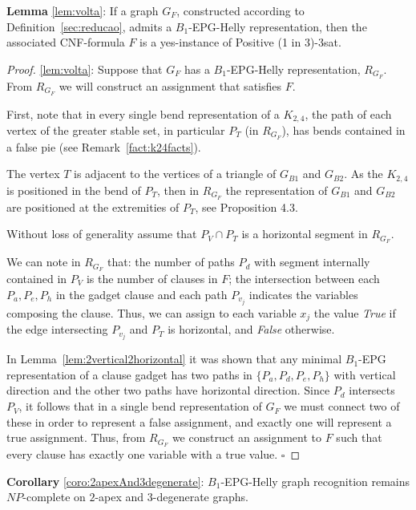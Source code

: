 \documentclass[runningheads]{llncs}
\begin{document}
\begin{lemma*}\textbf{Lemma} \ref{lem:volta}:
If a graph $G_F$, constructed according to Definition~\ref{sec:reducao}, admits a $B_1$-EPG-Helly representation, then the associated CNF-formula $F$ is a yes-instance of {\sc Positive (1 in 3)-3sat}.
\end{lemma*}

\begin{proof}%
\ref{lem:volta}:
Suppose that $G_F$ has a $B_1$-EPG-Helly representation, $R_{G_F}$.  From $R_{G_F}$ we will construct an assignment that satisfies $F$. 

First, note that in every single bend representation of a $K_{2,4}$, the path of each vertex of the greater stable set, in particular $P_T$ (in $R_{G_F}$), has bends contained in a false pie (see Remark~\ref{fact:k24facts}). 


The vertex $T$ is adjacent to the vertices of a triangle of $G_{B1}$ and $G_{B2}$. As the $K_{2,4}$ is positioned in the bend of $P_T$, then in $R_{G_F}$ the representation of $G_{B1}$ and $G_{B2}$ are positioned at the extremities of $P_T$, see Proposition 4.3. %


Without loss of generality assume that $P_V \cap P_T$ is a horizontal segment in $R_{G_F}$.

We can note in $R_{G_F}$ that: the number of paths $P_{d}$ with segment internally contained in $P_V$ is the number of clauses in $F$; the intersection between each $P_{a}, P_{e}, P_{h}$ in the gadget clause and each path $P_{v_j}$ indicates the variables composing the clause. Thus, we can assign to each variable $ x_{j}$ the value \textit{True} if the edge intersecting $P_{v_j}$ and $P_T$ is horizontal, and \textit{False} otherwise. 


In Lemma~\ref{lem:2vertical2horizontal} it was shown that any minimal $B_1$-EPG representation of a clause gadget has two paths in $\{P_{a}, P_{d}, P_{e}, P_{h}\}$ with vertical direction and the other two paths have horizontal direction. Since $P_{d}$ intersects $P_V$, it follows that in a single bend representation of $G_F$ we must connect two of these in order to represent a false assignment, and exactly one will represent a true assignment. Thus, from $R_{G_F}$ we construct an assignment to $F$ such that every clause has exactly one variable with a true value.  
$\square$ \end{proof}

\begin{coro*}\textbf{Corollary} \ref{coro:2apexAnd3degenerate}:
{\sc $B_{1}$-EPG-Helly graph recognition} remains $NP$-complete on $2$-apex and $3$-degenerate graphs.
\end{coro*}
\end{document}
